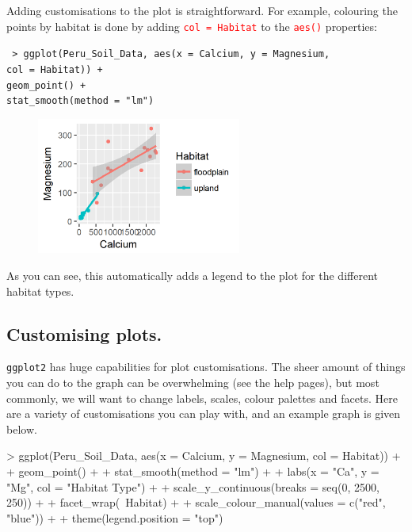 \documentclass[a4paper,12pt]{article}
\newcommand\code[1]{\textcolor{red}{\texttt{#1}}}
\begin{document}
Adding customisations to the plot is straightforward. For example, colouring the points by habitat is done by adding \code{col = Habitat} to the \code{aes()} properties:

\begin{shaded}
\texttt{ > ggplot(Peru\_Soil\_Data, aes(x = Calcium, y = Magnesium, \\
\hspace*{1cm} col = Habitat)) + \\
\hspace*{1cm} geom\_point() + \\
\hspace*{1cm} stat\_smooth(method = "lm")}
\end{shaded}

\begin{figure}[h]
	\centering
	\includegraphics[width=0.6\textwidth]{figs/fig3.png}
	\label{fig:fig3}
\end{figure}

As you can see, this automatically adds a legend to the plot for the different habitat types.

\subsection{Customising plots.}

\texttt{ggplot2} has huge capabilities for plot customisations. The sheer amount of things you can do to the graph can be overwhelming (see the help pages), but most commonly, we will want to change labels, scales, colour palettes and facets. Here are a variety of customisations you can play with, and an example graph is given below.
\clearpage

\begin{shaded}
\begin{Schunk}
\begin{Sinput}
> ggplot(Peru_Soil_Data, aes(x = Calcium, y = Magnesium, col = Habitat)) +
+   geom_point() +
+   stat_smooth(method = "lm") +
+   labs(x = "Ca", y = "Mg", col = "Habitat Type") +
+   scale_y_continuous(breaks = seq(0, 2500, 250)) +
+   facet_wrap(~Habitat) +
+   scale_colour_manual(values = c("red", "blue")) +
+   theme(legend.position = "top")
\end{Sinput}
\end{Schunk}
\end{shaded}
\end{document}
